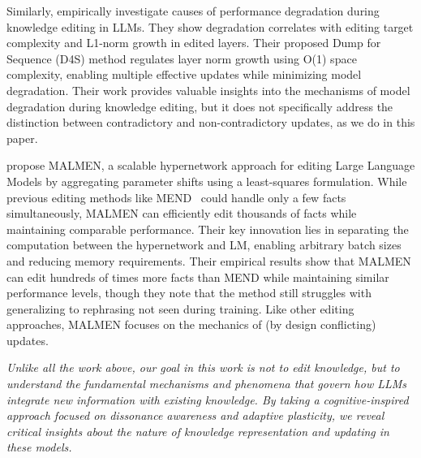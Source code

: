 Similarly, \citet{huang2024reasons} empirically investigate causes of performance degradation during knowledge editing in LLMs. They show degradation correlates with editing target complexity and L1-norm growth in edited layers. Their proposed Dump for Sequence (D4S) method regulates layer norm growth using O(1) space complexity, enabling multiple effective updates while minimizing model degradation. Their work provides valuable insights into the mechanisms of model degradation during knowledge editing, but it does not specifically address the distinction between contradictory and non-contradictory updates, as we do in this paper.

\citet{tan2023massive} propose MALMEN, a scalable hypernetwork approach for editing Large Language Models by aggregating parameter shifts using a least-squares formulation. While previous editing methods like MEND~\citep{mitchell2022fast} could handle only a few facts simultaneously, MALMEN can efficiently edit thousands of facts while maintaining comparable performance. Their key innovation lies in separating the computation between the hypernetwork and LM, enabling arbitrary batch sizes and reducing memory requirements. Their empirical results show that MALMEN can edit hundreds of times more facts than MEND while maintaining similar performance levels, though they note that the method still struggles with generalizing to rephrasing not seen during training. Like other editing approaches, MALMEN focuses on the mechanics of (by design conflicting) updates.

\textit{Unlike all the work above, our goal in this work is not to edit knowledge, but to understand the fundamental mechanisms and phenomena that govern how LLMs integrate new information with existing knowledge. By taking a cognitive-inspired approach focused on dissonance awareness and adaptive plasticity, we reveal critical insights about the nature of knowledge representation and updating in these models.}


